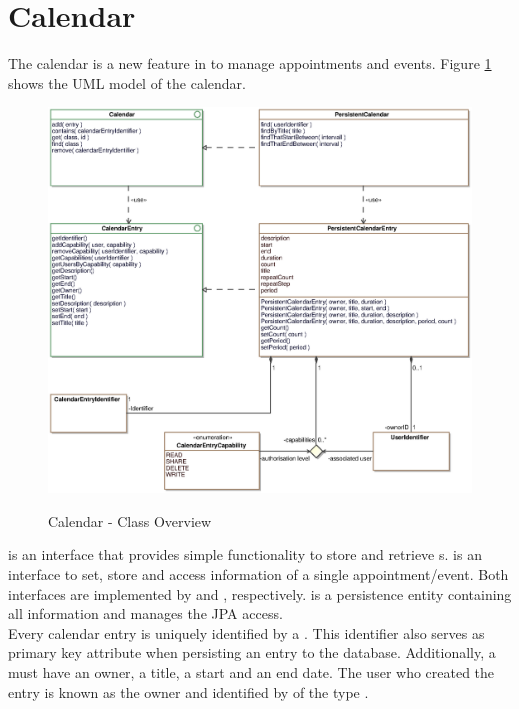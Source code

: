 \section{Calendar}
\label{sec:calendar}

The calendar is a new feature in \salespoint{} to manage appointments and events.
Figure \ref{calendar_overview} shows the UML model of the calendar.

\begin{figure}[ht]
	\centering
  \includegraphics[width=1.0\textwidth]{images/Calendar_Overview.eps}
	\label{calendar_overview}
	\caption{Calendar - Class Overview}
\end{figure}

 is an interface that provides simple functionality to store and retrieve s.
 is an interface to set, store and access information of a single appointment/event.
Both interfaces are implemented by  and , respectively.
 is a persistence entity containing all information and  manages the JPA access.
\\

Every calendar entry is uniquely identified by a .
This identifier also serves as primary key attribute when persisting an entry to the database.
Additionally, a  must have an owner, a title, a start and an end date.
The user who created the entry is known as the owner and identified by  of the type .
\\

